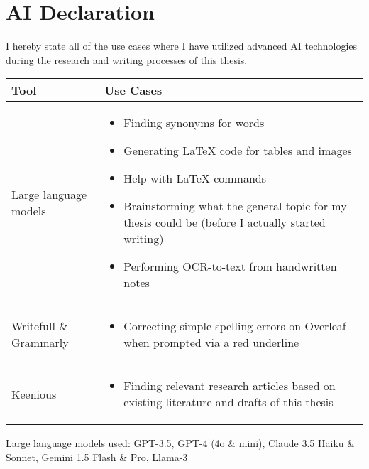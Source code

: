 


\chapter*{AI Declaration\label{extra:declaration}}
\begin{comment}
\end{comment}


I hereby state all of the use cases where I have utilized advanced AI technologies during the research and writing processes of this thesis.

\begin{table}[h]  
  \centering  
  \renewcommand{\arraystretch}{1.5} %
  \renewcommand{\labelitemi}{--}     %

  \begin{tabular}{>{\raggedright\arraybackslash}p{} >{\raggedright\arraybackslash}p{}}  
    \toprule
    \textbf{Tool} & \textbf{Use Cases} \\
    \midrule  
    Large language models &   
    \begin{itemize}  
      \item Finding synonyms for words
      \item Generating LaTeX code for tables and images  
      \item Help with LaTeX commands
      \item Brainstorming what the general topic for my thesis could be (before I actually started writing)
      \item Performing OCR-to-text from handwritten notes
      
    \end{itemize} \\
    \midrule  
    Writefull \& Grammarly &   
    \begin{itemize}  
      \item Correcting simple spelling errors on Overleaf when prompted via a red underline
    \end{itemize} \\
    \midrule  
    Keenious &   
    \begin{itemize}  
      \item Finding relevant research articles based on existing literature and drafts of this thesis
    \end{itemize} \\
    \bottomrule  
  \end{tabular}  
  \label{table:declaration}  
\end{table}  

Large language models used: GPT-3.5, GPT-4 (4o \& mini), Claude 3.5 Haiku \& Sonnet, Gemini 1.5 Flash \& Pro, Llama-3
